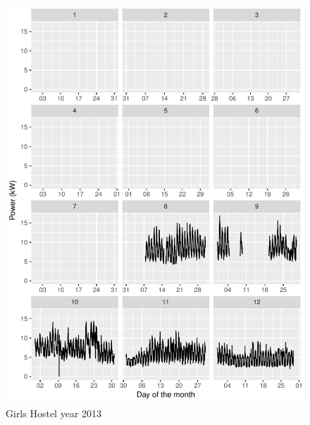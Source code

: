\documentclass[11pt, oneside]{article}   	%
\begin{document}
\begin{figure}
\includegraphics[keepaspectratio]{girls_hostel_year2013.pdf}
\caption{Girls Hostel year 2013}
\end{figure}
\end{document}
